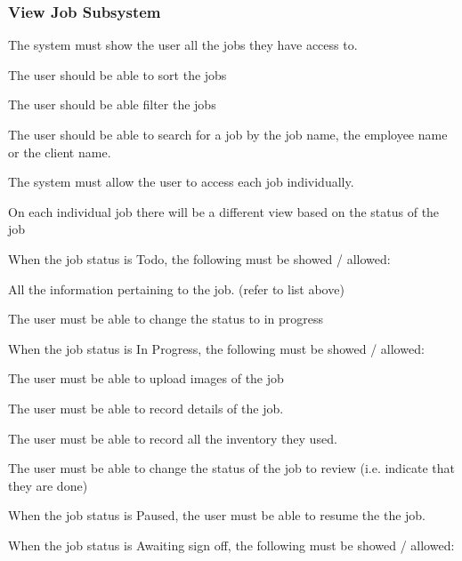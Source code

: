 \documentclass{article}
\begin{document}
	\subsubsection*{View Job Subsystem}	
	\begin{list}{R.}{}
		\item The system must show the user all the jobs they have access to.
		\begin{list}{R.}{}
			\item The user should be able to sort the jobs
			\item The user should be able filter the jobs 
			\item The user should be able to search for a job by the job name, the employee name or the client name. 
		\end{list}
		\item The system must allow the user to access each job individually.
		\item On each individual job there will be a different view based on the status of the job
		\item When the job status is Todo, the following must be showed / allowed:
		\begin{list}{R.}{}
			\item All the information pertaining to the job. (refer to list above)
			\item The user must be able to change the status to in progress
		\end{list}
		\item When the job status is In Progress, the following must be showed / allowed:
		\begin{list}{R.}{}
			\item The user must be able to upload images of the job
			\item The user must be able to record details of the job.
			\item The user must be able to record all the inventory they used. 
			\item The user must be able to change the status of the job to review (i.e. indicate that they are done)
		\end{list}
		\item When the job status is Paused, the user must be able to resume the the job.
		\item When the job status is Awaiting sign off, the following must be showed / allowed:

\end{list}
\end{document}
